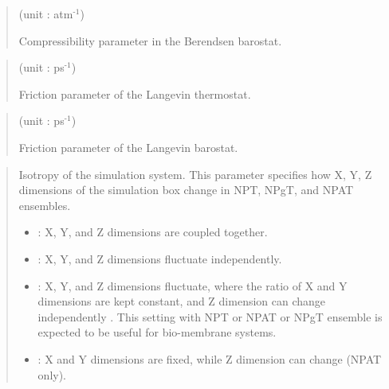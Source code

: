 \documentclass[a4paper,11pt,oneside,english]{sphinxmanual}
\begin{document}
 
\begin{quote}

 (unit : atm$^{\text{-1}}$)

Compressibility parameter in the Berendsen barostat.
\end{quote}

 
\begin{quote}

 (unit : ps$^{\text{-1}}$)

Friction parameter of the Langevin thermostat.
\end{quote}

 
\begin{quote}

 (unit : ps$^{\text{-1}}$)

Friction parameter of the Langevin barostat.
\end{quote}

 
\begin{quote}


Isotropy of the simulation system.
This parameter specifies how X, Y, Z dimensions of the simulation
box change in NPT, NPgT, and NPAT ensembles.
\begin{itemize}
\item {} 
: X, Y, and Z dimensions are coupled together.

\item {} 
: X, Y, and Z dimensions fluctuate independently.

\item {} 
: X, Y, and Z dimensions fluctuate, where the ratio of
X and Y dimensions are kept constant, and Z dimension can change
independently . This setting with NPT or NPAT or NPgT
ensemble is expected to be useful for bio-membrane systems.

\item {} 
: X and Y dimensions are fixed, while Z dimension can change
(NPAT only).

\end{itemize}
\end{quote}
\end{document}
